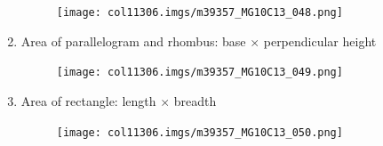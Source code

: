 \begin{enumerate}[noitemsep, label=\textbf{\arabic*}. ]
	\begin{figure}[H] %
    \begin{center}
    \label{m39357*id319816!!!underscore!!!media}\label{m39357*id319816!!!underscore!!!printimage}\texttt{[image: col11306.imgs/m39357\_MG10C13\_048.png]} %
        
      \vspace{2pt}
    \vspace{.1in}
    
    \end{center}

 \end{figure}   

    \addtocounter{footnote}{-0}
    \label{m39357*uid100}\item Area of parallelogram and rhombus: base $\ensuremath{\times}$ perpendicular height

    \setcounter{subfigure}{0}


	\begin{figure}[H] %
    \begin{center}
    \label{m39357*id319845!!!underscore!!!media}\label{m39357*id319845!!!underscore!!!printimage}\texttt{[image: col11306.imgs/m39357\_MG10C13\_049.png]} %
        
      \vspace{2pt}
    \vspace{.1in}
    
    \end{center}

 \end{figure}   

    \addtocounter{footnote}{-0}
    \label{m39357*uid101}\item Area of rectangle: length $\ensuremath{\times}$ breadth

    \setcounter{subfigure}{0}


	\begin{figure}[H] %
    \begin{center}
    \label{m39357*id319874!!!underscore!!!media}\label{m39357*id319874!!!underscore!!!printimage}\texttt{[image: col11306.imgs/m39357\_MG10C13\_050.png]} %
        
      \vspace{2pt}
    \vspace{.1in}
    

\end{center}
\end{figure}
\end{enumerate}
